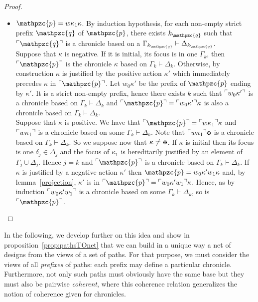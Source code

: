 \documentclass{LMCS}
\newcommand{\design}[1]{{\mathfrak{#1}}}
\newcommand{\pathLL}[1]{\mathpzc{#1}}\newcommand{\strategy}[1]{\pathLL{#1}}\newcommand{\view}[1]{\raisebox{.3ex}{$\ulcorner$}{#1}\raisebox{.3ex}{$\urcorner$}}\newcommand{\fullview}[1]{\raisebox{.3ex}{$\ulcorner\mkern-6mu\ulcorner\mkern-2mu$}{#1}\raisebox{.3ex}{$\mkern-2mu\urcorner\mkern-6mu\urcorner$}}\newcommand{\views}[1]{\view{#1}}\newcommand{\fullviews}[1]{\fullview{#1}}\newcommand{\shuffle}[1]{\llcorner\design{#1}\lrcorner}\newcommand{\PoD}[1]{{\mathcal{P}}_{#1}}\newcommand{\norm}[1]{\llbracket\design{#1}\rrbracket}
\begin{document}
\begin{proof}
\begin{itemize}
  \item $\pathLL{p}=w\kappa_1\kappa$. By induction hypothesis, for each non-empty strict prefix $\pathLL{q}$ of $\pathLL{p}$, there exists $k_\pathLL{q}$ such that $\view{\pathLL{q}}$ is a chronicle based on a $\Gamma_{k_\pathLL{q}}\vdash\Delta_{k_\pathLL{q}}$.\\
   Suppose that $\kappa$ is negative. If it is initial, its focus is in one $\Gamma_k$,  then $\view{\pathLL{p}}$ is the chronicle $\kappa$ based on $\Gamma_k\vdash\Delta_k$.  Otherwise, by construction $\kappa$ is justified by the positive action $\kappa'$ which immediately precedes $\kappa$ in $\view{\pathLL{p}}$. Let $w_0\kappa'$ be the prefix of $\pathLL{p}$ ending by $\kappa'$. It is a strict non-empty prefix, hence there exists $k$ such that $\view{w_0\kappa'}$ is a chronicle based on $\Gamma_k\vdash\Delta_k$ and $\view{\pathLL{p}}=\view{w_0\kappa'}\kappa$ is also a chronicle based on $\Gamma_k\vdash\Delta_k$.\\
Suppose that $\kappa$ is positive. We have that $\view{\pathLL{p}}=\view{w\kappa_1}\kappa$ and $\view{w\kappa_1}$ is a chronicle based on some $\Gamma_k\vdash\Delta_k$. Note that $\view{w\kappa_1}\daimon$ is a chronicle based on $\Gamma_k\vdash\Delta_k$. So we suppose now that $\kappa \neq \daimon$. If $\kappa$ is initial then  its focus  is one $\delta_j\in\Delta_j$ and   the focus of $\kappa_1$ is hereditarily justified by an element of $\Gamma_j\cup\Delta_j$.  Hence $j=k$ and $\view{\pathLL{p}}$  is a chronicle based on   $\Gamma_k\vdash \Delta_k$. If $\kappa$ is justified by a negative action $\kappa'$  then $\pathLL{p}=w_0\kappa'w_1\kappa$ and, by lemma~\ref{projection}, $\kappa'$ is in $\view{\pathLL{p}}=\view{w_0\kappa'w_1}\kappa$. Hence, as by induction $\view{w_0\kappa'w_1}$ is a chronicle based on some $\Gamma_k\vdash\Delta_k$, so is $\view{\pathLL{p}}$.
  \end{itemize}
\end{proof}

\noindent In the following, we develop further on this idea and show in proposition~\ref{prop:pathsTOnet} that we can build in a unique way a net of designs from the views of a set of paths. For that purpose, we must consider the views of all {\em prefixes} of paths: each prefix may define a particular chronicle. Furthermore, not only such paths must obviously have the same base but they must also be pairwise {\em coherent}, where this coherence relation generalizes the notion of coherence given for chronicles.
 
\end{document}
